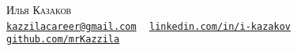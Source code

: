 \begin{center}
	{\huge \scshape Илья Казаков} \\
	\vspace{4pt}
	\small \href{mailto:kazzilacareer@gmail.com}{\texttt{kazzilacareer@gmail.com}} ~
	\href{https://linkedin.com/in/i-kazakov}{\texttt{linkedin.com/in/i-kazakov}} ~
	\href{https://github.com/mrKazzila}{\texttt{github.com/mrKazzila}}
	\vspace{-5pt}
\end{center}